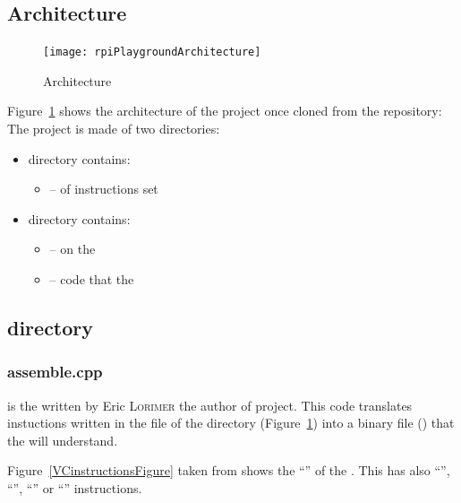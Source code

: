 \subsection{ Architecture}

\begin{figure}[!htbp]
	\centering
	\texttt{[image: rpiPlaygroundArchitecture]}
	\caption{ Architecture}
	\label{rpiPlaygroundFigure}
\end{figure}
\FloatBarrier

Figure~\ref{rpiPlaygroundFigure} shows the architecture of the  project once cloned from the  repository: 
The project is made of two directories:
\begin{itemize}
\item {} directory contains:
	\begin{itemize}
		\item {} --  of \vc{} instructions set
	\end{itemize}
\item {} directory contains:
	\begin{itemize}
		\item {} --  on the \vc
		\item {} -- code that  the \vc
	\end{itemize}
\end{itemize}



\subsection{ directory}


\subsubsection{assemble.cpp}

 is the  written by Eric \textsc{Lorimer} the author of  project. This code translates instuctions written in the  file of the  directory (Figure~\ref{rpiPlaygroundFigure}) into a binary file () that the \vc{} will understand.

Figure~\ref{VCinstructionsFigure} taken from \parencite{refVC} shows the \enquote{} of the \vc{}. This  has also \enquote{}, \enquote{}, \enquote{} or \enquote{} instructions.


